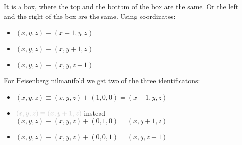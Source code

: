 \documentclass[12pt]{article}
\begin{document}
It is a box, where the top and the bottom of the box are the same.  Or the left and the right of the box are the same.  Using coordinates:
\begin{itemize}
\item $(x,y,z) \equiv (x+1, y, z) $
\item $(x,y,z) \equiv (x, y+1, z) $
\item $(x,y,z) \equiv (x, y, z+1) $
\end{itemize}
For Heisenberg nilmanifold we get two of the three identificatons:
\begin{itemize}
\item $(x,y,z) \equiv (x, y, z)+(1,0,0)=(x+1,y,z) $
\item $\color{black!20!white}{(x,y,z) \equiv (x, y+1, z)}$ instead $(x,y,z) \equiv (x,y,z) + (0,1,0)=(x,y+1,z) $
\item $(x,y,z) \equiv (x, y, z)+(0,0,1)=(x,y,z+1) $ 
\end{itemize}
\newpage
\end{document}
